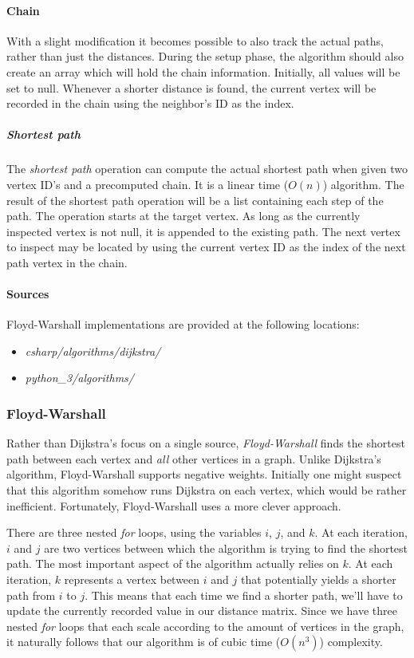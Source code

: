 \documentclass{article}
\begin{document}
\paragraph{Chain}
With a slight modification it becomes possible to also track the actual paths, rather than just the distances.
During the setup phase, the algorithm should also create an array which will hold the chain information.
Initially, all values will be set to null. Whenever a shorter distance is found, the current vertex will be
recorded in the chain using the neighbor's ID as the index.

\subparagraph{Shortest path}
The {\em shortest path} operation can compute the actual shortest path when given two vertex ID's and a precomputed
chain. It is a linear time (\(O(n)\)) algorithm. The result of the shortest path operation will be a list containing
each step of the path. The operation starts at the target vertex. As long as the currently inspected vertex is not
null, it is appended to the existing path. The next vertex to inspect may be located by using the current vertex ID
as the index of the next path vertex in the chain.

\begin{samepage}
  \paragraph{Sources}
  Floyd-Warshall implementations are provided at the following locations:
  \begin{itemize}
  \item{{\em csharp/algorithms/dijkstra/}}
  \item{{\em python\_3/algorithms/}}
  \end{itemize}
\end{samepage}


\subsubsection{Floyd-Warshall}
Rather than Dijkstra's focus on a single source, {\em Floyd-Warshall} finds the shortest path between each vertex
and {\em all} other vertices in a graph. Unlike Dijkstra's algorithm, Floyd-Warshall supports negative weights.
Initially one might suspect that this algorithm somehow runs Dijkstra on each vertex, which would be rather
inefficient. Fortunately, Floyd-Warshall uses a more clever approach.

There are three nested {\em for} loops, using the variables \(i\), \(j\), and \(k\). At each iteration,
\(i\) and \(j\) are two vertices between which the algorithm is trying to find the shortest path. The most important
aspect of the algorithm actually relies on \(k\). At each iteration, \(k\) represents a vertex between \(i\) and
\(j\) that potentially yields a shorter path from \(i\) to \(j\). This means that each time we find a shorter path,
we'll have to update the currently recorded value in our distance matrix. Since we have three nested {\em for} loops
that each scale according to the amount of vertices in the graph, it naturally follows that our algorithm is of
cubic time (\(O(n^3)\)) complexity.
\end{document}
